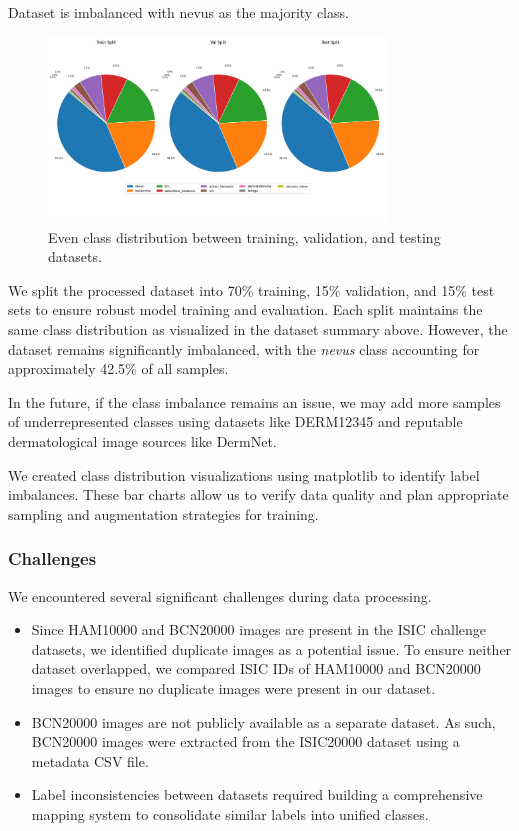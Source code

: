 \documentclass{article} %
\begin{document}
Dataset is imbalanced with nevus as the majority class.

\begin{figure}[h]
\begin{center}
\includegraphics[width=0.8\textwidth]{Figs/dataset_split_distribution.png}
\end{center}
\caption{Even class distribution between training, validation, and testing datasets.}
\end{figure}

We split the processed dataset into 70\% training, 15\% validation, and 15\% test sets to ensure robust model training and evaluation. Each split maintains the same class distribution as visualized in the dataset summary above. However, the dataset remains significantly imbalanced, with the \textit{nevus} class accounting for approximately 42.5\% of all samples.

In the future, if the class imbalance remains an issue, we may add more samples of underrepresented classes using datasets like DERM12345 and reputable dermatological image sources like DermNet.

We created class distribution visualizations using matplotlib to identify label imbalances. These bar charts allow us to verify data quality and plan appropriate sampling and augmentation strategies for training.

\subsubsection{Challenges}

We encountered several significant challenges during data processing.

\begin{itemize}
\item Since HAM10000 and BCN20000 images are present in the ISIC challenge datasets, we identified duplicate images as a potential issue. To ensure neither dataset overlapped, we compared ISIC IDs of HAM10000 and BCN20000 images to ensure no duplicate images were present in our dataset.
\item BCN20000 images are not publicly available as a separate dataset. As such, BCN20000 images were extracted from the ISIC20000 dataset using a metadata CSV file.
\item Label inconsistencies between datasets required building a comprehensive mapping system to consolidate similar labels into unified classes.
\end{itemize}
\end{document}
